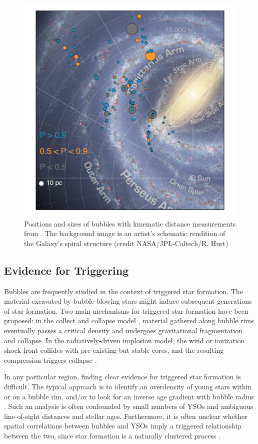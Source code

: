 \begin{figure}[h!]
\includegraphics{dist_map}
\caption{Positions and sizes of bubbles with kinematic distance measurements from \cite{Anderson11}. The background image is an artist's schematic rendition of the Galaxy's spiral structure (credit NASA/JPL-Caltech/R. Hurt)}
\label{fig:dist_map}
\end{figure}

\subsection{Evidence for Triggering}

Bubbles are frequently studied in the context of triggered star formation. The material excavated by bubble-blowing stars might induce subsequent generations of star formation. Two main mechanisms for triggered star formation have been proposed: in the collect and collapse model \citep{Whitworth94, Dale07}, material gathered along bubble rims eventually passes a critical density and undergoes gravitational fragmentation and collapse. In the radiatively-driven implosion model, the wind or ionization shock front collides with pre-existing but stable cores, and the resulting compression triggers collapse \citep{Bertoldi89}.

In any particular region, finding clear evidence for triggered star formation is difficult. The typical approach is to identify an overdensity of young stars within or on a bubble rim, and/or to look for an inverse age gradient with bubble radius \citep{Deharveng05, Zavagno06, Koenig08}. Such an analysis is often confounded by small numbers of YSOs and ambiguous line-of-sight distances and stellar ages. Furthermore, it is often unclear whether spatial correlations between bubbles and YSOs imply a triggered relationship between the two, since star formation is a naturally clustered process \citep{Lada03}.

